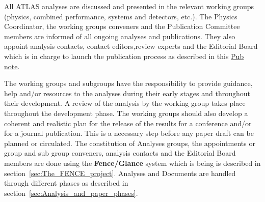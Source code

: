 All ATLAS analyses are discussed and presented in the relevant working groups  (physics, combined performance, systems and detectors, etc.). The Physics Coordinator, the working groups conveners and the Publication Committee members are informed of all ongoing analyses and publications. They also appoint analysis contacts, contact editors,review experts and the Editorial Board which is in charge to launch the publication process as described in this \href{https://cds.cern.ch/record/1980862}{Pub note}.

The working groups and subgroups have the responsibility to provide guidance, help and/or resources to the analyses during their early stages and throughout their development. A review of the analysis by the working group takes place throughout the development phase. The working groups should also develop a coherent and realistic plan for the release  of the results for a conference and/or for a journal publication. This is a necessary step before any paper draft can be planned or circulated. The constitution of Analyses groups, the appointments or group and sub group conveners, analysis contacts and the Editorial Board members are done using the\textbf{ Fence/Glance} system which is being is described in section~\ref{sec:The_FENCE_project}. Analyses and Documents are handled through different phases as described in section~\ref{sec:Analysis_and_paper_phases}.

